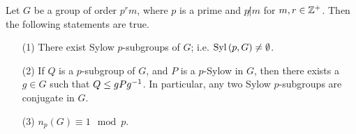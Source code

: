 \begin{theorem}\label{4.5.2}
    Let $G$ be a group of order  $p^rm$, where  $p$ is a prime and  $p \not| m$
    for  $m,r \in \mathbb{Z}^+$. Then the following statements are true.
    \begin{enumerate}
        \item[(1)] There exist Sylow $p$-subgroups of $G$; i.e. $\operatorname{Syl}{(p,G)}
            \neq \emptyset$.

        \item[(2)] If $Q$ is a  $p$-subgroup of $G$, and $P$ is a $p$-Sylow in
            $G$, then there exists a $g \in G$ such that $Q \leq gPg^{-1}$. In
            particular, any two Sylow $p$-subgroups are conjugate in $G$.

        \item[(3)] $n_p(G) \equiv 1 \mod{p}$.
    \end{enumerate}
\end{theorem}
